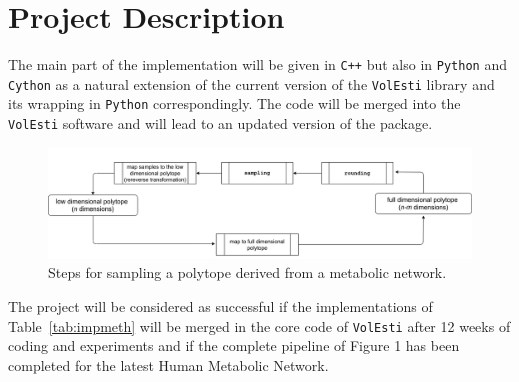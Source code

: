 \documentclass[a4paper, 12pt]{article}
\begin{document}


\section{Project Description}
The main part of the implementation will be given in \texttt{C++} but also in \texttt{Python} and \texttt{Cython} as a natural extension of the current version of the \texttt{VolEsti} library and its wrapping in \texttt{Python} correspondingly. 
The code will be merged into the \texttt{VolEsti} software and will lead to an updated version of the package. %

\begin{figure}[!h]
  \includegraphics[width=\linewidth]{sampling_pipeline.png}
  \caption{Steps for sampling a polytope derived from a metabolic network.}
  \label{fig:Pipeline}
\end{figure}

The project will be considered as successful if the implementations of Table~\ref{tab:impmeth} will be merged in the core code of \texttt{VolEsti} after 12 weeks of coding and experiments and if the complete pipeline of Figure 1 has been completed for the latest Human Metabolic Network. %
\end{document}
